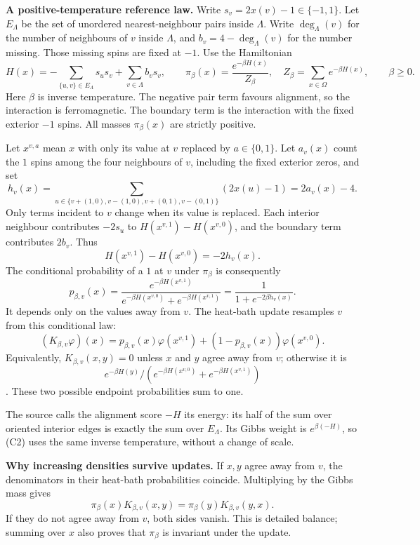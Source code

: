 \documentclass[
  11pt,
  a4paper,
]{article}
\begin{document}
\textbf{A positive-temperature reference law.} Write
\(s_v=2x(v)-1\in\{-1,1\}\). Let \(E_\Lambda\) be the set of unordered
nearest-neighbour pairs inside \(\Lambda\). Write \(\deg_\Lambda(v)\)
for the number of neighbours of \(v\) inside \(\Lambda\), and
\(b_v=4-\deg_\Lambda(v)\) for the number missing. Those missing spins
are fixed at \(-1\). Use the Hamiltonian \[
H(x)=-\sum_{\{u,v\}\in E_\Lambda}s_us_v+\sum_{v\in\Lambda}b_vs_v,
\qquad
\pi_\beta(x)=\frac{e^{-\beta H(x)}}{Z_\beta},
\quad
Z_\beta=\sum_{x\in\Omega}e^{-\beta H(x)},\qquad\beta\geq0.
\tag{C2}
\] Here \(\beta\) is inverse temperature. The negative pair term favours
alignment, so the interaction is ferromagnetic. The boundary term is the
interaction with the fixed exterior \(-1\) spins. All masses
\(\pi_\beta(x)\) are strictly positive.

Let \(x^{v,a}\) mean \(x\) with only its value at \(v\) replaced by
\(a\in\{0,1\}\). Let \(a_v(x)\) count the \(1\) spins among the four
neighbours of \(v\), including the fixed exterior zeros, and set \[
h_v(x)=\sum_{u\in\{v+(1,0),v-(1,0),v+(0,1),v-(0,1)\}}(2x(u)-1)=2a_v(x)-4.
\] Only terms incident to \(v\) change when its value is replaced. Each
interior neighbour contributes \(-2s_u\) to \(H(x^{v,1})-H(x^{v,0})\),
and the boundary term contributes \(2b_v\). Thus \[
H(x^{v,1})-H(x^{v,0})=-2h_v(x).
\] The conditional probability of a \(1\) at \(v\) under \(\pi_\beta\)
is consequently \[
p_{\beta,v}(x)
=\frac{e^{-\beta H(x^{v,1})}}
 {e^{-\beta H(x^{v,0})}+e^{-\beta H(x^{v,1})}}
=\frac1{1+e^{-2\beta h_v(x)}}.
\tag{C3}
\] It depends only on the values away from \(v\). The heat-bath update
resamples \(v\) from this conditional law: \[
(K_{\beta,v}\varphi)(x)
=p_{\beta,v}(x)\varphi(x^{v,1})
 +(1-p_{\beta,v}(x))\varphi(x^{v,0}).
\tag{C4}
\] Equivalently, \(K_{\beta,v}(x,y)=0\) unless \(x\) and \(y\) agree
away from \(v\); otherwise it is
\[e^{-\beta H(y)}/(e^{-\beta H(x^{v,0})}+e^{-\beta H(x^{v,1})})\]. These
two possible endpoint probabilities sum to one.

The source calls the alignment score \(-H\) its energy: its half of the
sum over oriented interior edges is exactly the sum over \(E_\Lambda\).
Its Gibbs weight is \(e^{\beta(-H)}\), so (C2) uses the same inverse
temperature, without a change of scale.

\textbf{Why increasing densities survive updates.} If \(x,y\) agree away
from \(v\), the denominators in their heat-bath probabilities coincide.
Multiplying by the Gibbs mass gives \[
\pi_\beta(x)K_{\beta,v}(x,y)
=\pi_\beta(y)K_{\beta,v}(y,x).
\tag{C5}
\] If they do not agree away from \(v\), both sides vanish. This is
detailed balance; summing over \(x\) also proves that \(\pi_\beta\) is
invariant under the update.
\end{document}
